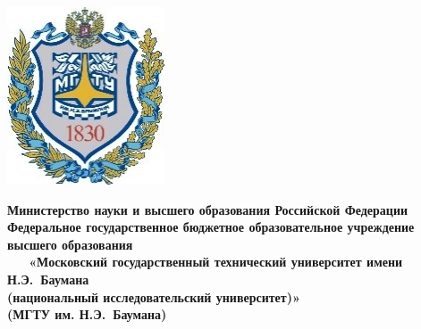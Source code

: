 \documentclass[12pt]{report}
\begin{document}
	\thispagestyle{empty}
	\begin{titlepage}
		\noindent \begin{minipage}{0.15\textwidth}
			\includegraphics[width=\linewidth]{b_logo}
		\end{minipage}
		\noindent\begin{minipage}{0.9\textwidth}\centering
			\textbf{Министерство науки и высшего образования Российской Федерации}\\
			\textbf{Федеральное государственное бюджетное образовательное учреждение высшего образования}\\
			\textbf{~~~«Московский государственный технический университет имени Н.Э.~Баумана}\\
			\textbf{(национальный исследовательский университет)»}\\
			\textbf{(МГТУ им. Н.Э.~Баумана)}
		\end{minipage}
		

\end{titlepage}
\end{document}
